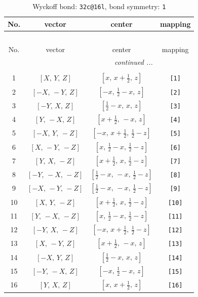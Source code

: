 \documentclass[fleqn,8pt]{jsarticle}
\begin{document}
\begin{longtable}{cccc}
\caption{Wyckoff bond: {\tt 32c@16l}, bond symmetry: {\tt 1}}
 \\
 \hline \hline
No. & vector & center & mapping \\ \hline \endfirsthead

\multicolumn{3}{l}{\tablename\ \thetable{}} \\
 \hline \hline
No. & vector & center & mapping \\ \hline \endhead

 \hline \hline
\multicolumn{3}{r}{\footnotesize\it continued ...} \\ \endfoot

 \hline \hline
\multicolumn{3}{r}{} \\ \endlastfoot

1 & $\left[ X,\, Y,\, Z \right]$ & $\left[ x,\, x + \frac{1}{2},\, z \right]$ & {\tt [1]} \\ \hline
2 & $\left[ - X,\, - Y,\, Z \right]$ & $\left[ - x,\, \frac{1}{2} - x,\, z \right]$ & {\tt [2]} \\ \hline
3 & $\left[ - Y,\, X,\, Z \right]$ & $\left[ \frac{1}{2} - x,\, x,\, z \right]$ & {\tt [3]} \\ \hline
4 & $\left[ Y,\, - X,\, Z \right]$ & $\left[ x + \frac{1}{2},\, - x,\, z \right]$ & {\tt [4]} \\ \hline
5 & $\left[ - X,\, Y,\, - Z \right]$ & $\left[ - x,\, x + \frac{1}{2},\, \frac{1}{2} - z \right]$ & {\tt [5]} \\ \hline
6 & $\left[ X,\, - Y,\, - Z \right]$ & $\left[ x,\, \frac{1}{2} - x,\, \frac{1}{2} - z \right]$ & {\tt [6]} \\ \hline
7 & $\left[ Y,\, X,\, - Z \right]$ & $\left[ x + \frac{1}{2},\, x,\, \frac{1}{2} - z \right]$ & {\tt [7]} \\ \hline
8 & $\left[ - Y,\, - X,\, - Z \right]$ & $\left[ \frac{1}{2} - x,\, - x,\, \frac{1}{2} - z \right]$ & {\tt [8]} \\ \hline
9 & $\left[ - X,\, - Y,\, - Z \right]$ & $\left[ \frac{1}{2} - x,\, - x,\, \frac{1}{2} - z \right]$ & {\tt [9]} \\ \hline
10 & $\left[ X,\, Y,\, - Z \right]$ & $\left[ x + \frac{1}{2},\, x,\, \frac{1}{2} - z \right]$ & {\tt [10]} \\ \hline
11 & $\left[ Y,\, - X,\, - Z \right]$ & $\left[ x,\, \frac{1}{2} - x,\, \frac{1}{2} - z \right]$ & {\tt [11]} \\ \hline
12 & $\left[ - Y,\, X,\, - Z \right]$ & $\left[ - x,\, x + \frac{1}{2},\, \frac{1}{2} - z \right]$ & {\tt [12]} \\ \hline
13 & $\left[ X,\, - Y,\, Z \right]$ & $\left[ x + \frac{1}{2},\, - x,\, z \right]$ & {\tt [13]} \\ \hline
14 & $\left[ - X,\, Y,\, Z \right]$ & $\left[ \frac{1}{2} - x,\, x,\, z \right]$ & {\tt [14]} \\ \hline
15 & $\left[ - Y,\, - X,\, Z \right]$ & $\left[ - x,\, \frac{1}{2} - x,\, z \right]$ & {\tt [15]} \\ \hline
16 & $\left[ Y,\, X,\, Z \right]$ & $\left[ x,\, x + \frac{1}{2},\, z \right]$ & {\tt [16]} \\
\end{longtable}
\end{document}
